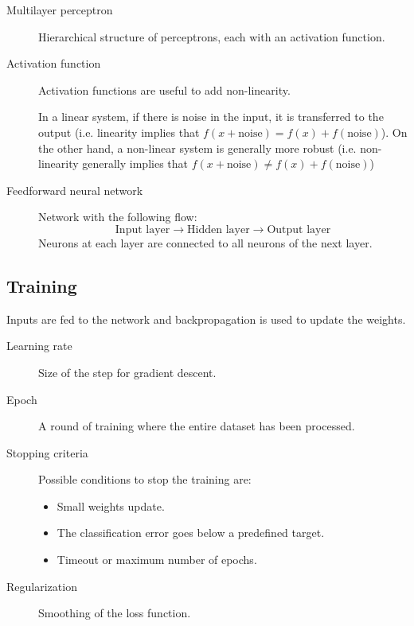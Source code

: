 \begin{description}
    \item[Multilayer perceptron] 
        Hierarchical structure of perceptrons, each with an activation function.

    \item[Activation function] 
        Activation functions are useful to add non-linearity.

        In a linear system, if there is noise in the input, it is transferred to the output 
        (i.e. linearity implies that $f(x + \text{noise}) = f(x) + f(\text{noise})$).
        On the other hand, a non-linear system is generally more robust 
        (i.e. non-linearity generally implies that $f(x + \text{noise}) \neq f(x) + f(\text{noise})$)

    \item[Feedforward neural network] 
        Network with the following flow:
        \[ \text{Input layer} \rightarrow \text{Hidden layer} \rightarrow \text{Output layer} \]
        Neurons at each layer are connected to all neurons of the next layer.
\end{description}


\subsection{Training}
Inputs are fed to the network and backpropagation is used to update the weights.

\begin{description}
    \item[Learning rate] 
        Size of the step for gradient descent.

    \item[Epoch]  
        A round of training where the entire dataset has been processed.

    \item[Stopping criteria] 
        Possible conditions to stop the training are:
        \begin{itemize}
            \item Small weights update.
            \item The classification error goes below a predefined target.
            \item Timeout or maximum number of epochs.
        \end{itemize}

    \item[Regularization] 
        Smoothing of the loss function.
\end{description}




